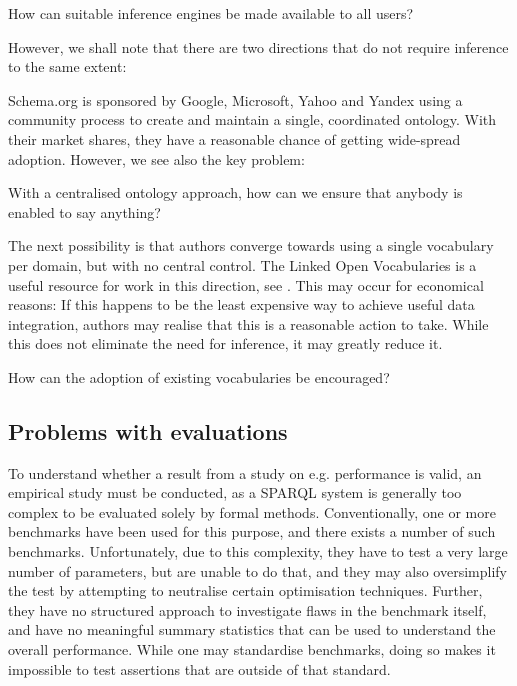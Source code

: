 \begin{problem}\label{prob:infgivecode}
How can suitable inference engines be made available to all users?
\end{problem}


However, we shall note that there are two directions that do not
require inference to the same extent: 

Schema.org is sponsored by Google, Microsoft, Yahoo and Yandex using a
community process to create and maintain a single, coordinated
ontology. With their market shares, they have a reasonable chance of
getting wide-spread adoption. However, we see also the key problem:

\begin{problem}\label{prob:sayanything}
With a centralised ontology approach, how can we ensure that anybody is enabled to say
anything?
\end{problem}

The next possibility is that authors converge towards using a single
vocabulary per domain, but with no central control. The Linked Open
Vocabularies is a useful resource for work in this direction, see
\cite{lov2}. This may occur for economical reasons: If this happens to
be the least expensive way to achieve useful data integration, authors
may realise that this is a reasonable action to take. While this does
not eliminate the need for inference, it may greatly reduce it.

\begin{problem}\label{prob:useexist}
How can the adoption of existing vocabularies be encouraged? 
\end{problem}


\subsection{Problems with evaluations}\label{sec:evalproblems}

To understand whether a result from a study on e.g. performance is
valid, an empirical study must be conducted, as a SPARQL system is
generally too complex to be evaluated solely by formal
methods. Conventionally, one or more benchmarks have been used for
this purpose, and there exists a number of such
benchmarks. Unfortunately, due to this complexity, they have to test a
very large number of parameters, but are unable to do that, and they
may also oversimplify the test by attempting to neutralise certain
optimisation techniques. Further, they have no structured approach to
investigate flaws in the benchmark itself, and have no meaningful
summary statistics that can be used to understand the overall
performance. While one may standardise benchmarks, doing so makes it
impossible to test assertions that are outside of that standard. 

